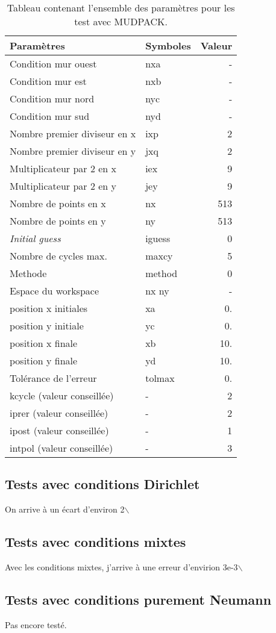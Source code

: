 \documentclass[10pt]{article}
\numberwithin{equation}{section}
\newcommand{\pt}{\hspace{1pt}}
\begin{document}
\begin{table}[htbp]
\caption{\label{tab:org335f01d}Tableau contenant l'ensemble des paramètres pour les test avec MUDPACK.}
\centering
\begin{tabular}{llr}
Paramètres & Symboles & Valeur\\[0pt]
\hline
\hline
Condition mur ouest & nxa & -\\[0pt]
Condition mur est & nxb & -\\[0pt]
Condition mur nord & nyc & -\\[0pt]
Condition mur sud & nyd & -\\[0pt]
Nombre premier diviseur en x & ixp & 2\\[0pt]
Nombre premier diviseur en y & jxq & 2\\[0pt]
Multiplicateur par 2 en x & iex & 9\\[0pt]
Multiplicateur par 2 en y & jey & 9\\[0pt]
Nombre de points en x & nx & 513\\[0pt]
Nombre de points en y & ny & 513\\[0pt]
\emph{Initial guess} & iguess & 0\\[0pt]
Nombre de cycles max. & maxcy & 5\\[0pt]
Methode & method & 0\\[0pt]
Espace du workspace & nx\pt\texttimes{} ny & -\\[0pt]
\hline
position x initiales & xa & 0.\\[0pt]
position y initiale & yc & 0.\\[0pt]
position x finale & xb & 10.\\[0pt]
position y finale & yd & 10.\\[0pt]
Tolérance de l'erreur & tolmax & 0.\\[0pt]
\hline
kcycle (valeur conseillée) & - & 2\\[0pt]
iprer (valeur conseillée) & - & 2\\[0pt]
ipost (valeur conseillée) & - & 1\\[0pt]
intpol (valeur conseillée) & - & 3\\[0pt]
\end{tabular}
\end{table}


\subsection{Tests avec conditions Dirichlet}
\label{sec:org1789d3d}
On arrive à un écart d'environ 2$\backslash$%


\subsection{Tests avec conditions mixtes}
\label{sec:orgc21519c}
Avec les conditions mixtes, j'arrive à une erreur d'envirion 3e-3$\backslash$%
\subsection{Tests avec conditions purement Neumann}
\label{sec:org76f45eb}
Pas encore testé.
\end{document}
